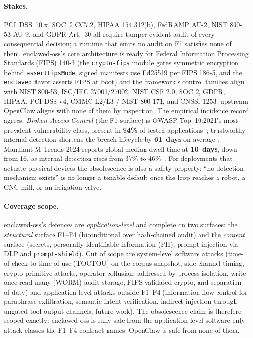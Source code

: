 \documentclass[11pt]{article}
\begin{document}
\paragraph{Stakes.} PCI~DSS~10.x, SOC~2 CC7.2, HIPAA 164.312(b),
FedRAMP AU-2, NIST 800-53 AU-9, and GDPR Art.~30 all require
tamper-evident audit of every consequential decision; a runtime that
emits no audit on F1 satisfies none of them. enclawed-oss's core
architecture is ready for Federal Information Processing Standards
(FIPS) 140-3 (the \texttt{crypto-fips} module gates symmetric
encryption behind \texttt{assertFipsMode}, signed manifests use
Ed25519 per FIPS 186-5, and the \texttt{enclaved} flavor asserts
FIPS at boot) and the framework's control families
align with NIST 800-53, ISO/IEC 27001/27002, NIST CSF 2.0, SOC 2,
GDPR, HIPAA, PCI DSS v4, CMMC L2/L3 / NIST 800-171, and CNSSI 1253;
upstream OpenClaw aligns with none of them by inspection. The
empirical incidence record agrees: \emph{Broken Access Control}
(the F1 surface) is OWASP Top~10:2021's most prevalent
vulnerability class, present in \textbf{94\%} of tested
applications~\cite{OWASP_A01_2021}; trustworthy internal detection
shortens the breach lifecycle by \textbf{61~days} on average
\cite{IBM_CostOfBreach_2024}; Mandiant M-Trends 2024 reports
global median dwell time at \textbf{10~days}, down from 16, as
internal detection rises from 37\% to
46\%~\cite{Mandiant_MTrends_2024}. For deployments that actuate
physical devices the obsolescence is also a safety property: ``no
detection mechanism exists'' is no longer a tenable default once
the loop reaches a robot, a CNC mill, or an irrigation
valve.

\paragraph{Coverage scope.} enclawed-oss's defences are
\emph{application-level} and complete on two surfaces: the
\emph{structural} surface F1--F4 (biconditional over hash-chained
audit) and the \emph{content} surface (secrets, personally
identifiable information (PII), prompt injection via DLP and
\texttt{prompt-shield}). Out of scope are system-level software
attacks (time-of-check-to-time-of-use (TOCTOU) on the corpus
snapshot, side-channel timing, crypto-primitive attacks, operator
collusion; addressed by process isolation, write-once-read-many
(WORM) audit storage, FIPS-validated crypto, and separation of
duty) and application-level attacks outside F1--F4
(information-flow control for paraphrase exfiltration, semantic
intent verification, indirect injection through ungated tool-output
channels; future work). The obsolescence claim is therefore scoped
exactly: enclawed-oss is fully safe from the application-level
software-only attack classes the F1--F4 contract names; OpenClaw is
safe from none of them.
\end{document}
